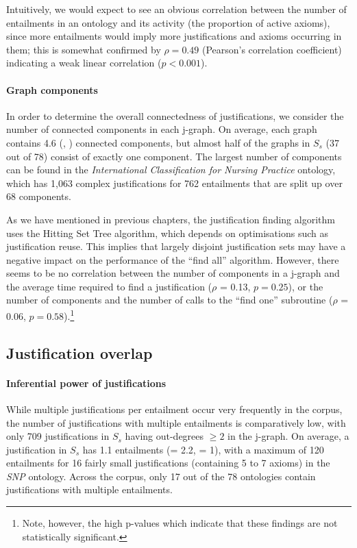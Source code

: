 Intuitively, we would expect to see an obvious correlation between the number of entailments in an ontology and its activity (the proportion of active axioms), since more entailments would imply more justifications and axioms occurring in them; this is somewhat confirmed by $\rho = 0.49$ (Pearson's correlation coefficient) indicating a weak linear correlation ($p < 0.001$).


\paragraph{Graph components}
In order to determine the overall connectedness of justifications, we consider the number of connected components in each j-graph. On average, each graph contains 4.6 (, ) connected components, but almost half of the graphs in $S_s$ (37 out of 78) consist of exactly one component. The largest number of components can be found in the \emph{International Classification for Nursing Practice} ontology, which has 1,063 complex justifications for 762 entailments that are split up over 68 components.

As we have mentioned in previous chapters, the justification finding algorithm uses the Hitting Set Tree algorithm, which depends on optimisations such as justification reuse. This implies that largely disjoint justification sets may have a negative impact on the performance of the \enquote{find all} algorithm. However, there seems to be no correlation between the number of components in a j-graph and the average time required to find a justification ($\rho$ = 0.13, $p = 0.25$), or the number of components and the number of calls to the \enquote{find one} subroutine ($\rho$ = 0.06, $p = 0.58$).\footnote{Note, however, the high p-values which indicate that these findings are not statistically significant.}


\subsection{Justification overlap}

\paragraph{Inferential power of justifications}

While multiple justifications per entailment occur very frequently in the corpus, the number of justifications with multiple entailments is comparatively low, with only 709 justifications in $S_{s}$ having out-degrees $\geq2$ in the j-graph. On average, a justification in $S_{s}$ has 1.1 entailments (\sdev = 2.2, \median = 1), with a maximum of 120 entailments for 16 fairly small justifications (containing 5 to 7 axioms) in the \emph{SNP} ontology. Across the corpus, only 17 out of the 78 ontologies contain justifications with multiple entailments.

